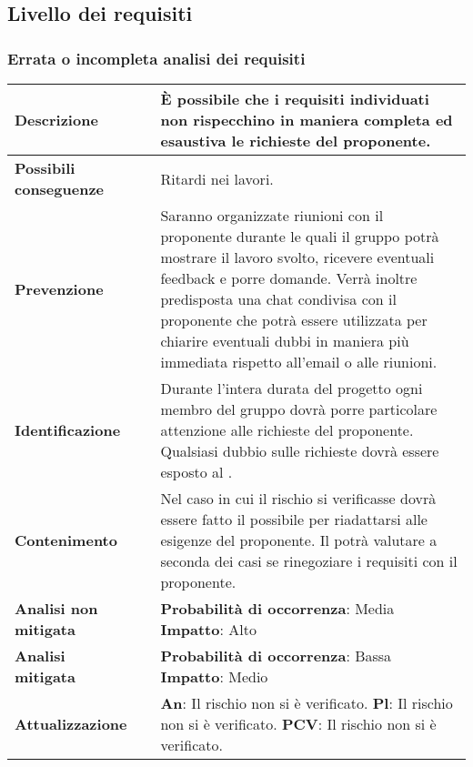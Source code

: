 	\newpage
	\subsection {Livello dei requisiti}
	\subsubsection {Errata o incompleta analisi dei requisiti}
	\label{subsec:erratiRequisiti}
	
	\small
	\begin{table}[H]
		\begin{center}			
			\begin{tabular}{p{2.5cm}p{0.5cm}p{11cm}}
				\arrayrulecolor{lightgray}
				
				\toprule				
				\textbf{Descrizione}
				& &
				È possibile che i requisiti individuati non rispecchino in maniera completa ed esaustiva le richieste del proponente.
				\\
				\midrule
				\textbf{Possibili \newline conseguenze}
				& &
				Ritardi nei lavori.
				\\
				\midrule
				\textbf{Prevenzione}
				& &
				Saranno organizzate riunioni con il proponente durante le quali il gruppo potrà mostrare il lavoro svolto, ricevere eventuali feedback e porre domande. Verrà inoltre predisposta una chat condivisa con il proponente che potrà essere utilizzata per chiarire eventuali dubbi in maniera più immediata rispetto all'email o alle riunioni.
				\\
				\midrule
				\textbf{Identificazione}
				& &
				Durante l'intera durata del progetto ogni membro del gruppo dovrà porre particolare attenzione alle richieste del proponente. Qualsiasi dubbio sulle richieste dovrà essere esposto al \responsabilediprogetto.
				\\
				\midrule
				\textbf{Contenimento}
				& &
				Nel caso in cui il rischio si verificasse dovrà essere fatto il possibile per riadattarsi alle esigenze del proponente. Il \responsabilediprogetto{} potrà valutare a seconda dei casi se rinegoziare i requisiti con il proponente.
				\\
				\midrule
				\textbf{Analisi \newline non mitigata}
				& &
				\textbf{Probabilità di occorrenza}: Media
				\newline
				\textbf{Impatto}: Alto
				\\
				\midrule
				\textbf{Analisi \newline mitigata}
				& &
				\textbf{Probabilità di occorrenza}: Bassa
				\newline
				\textbf{Impatto}: Medio
				\\
				\midrule
				\textbf{Attualizzazione}
				& &
				\textbf{An}: Il rischio non si è verificato.
				\newline
				\textbf{Pl}: Il rischio non si è verificato.
				\newline
				\textbf{PCV}: Il rischio non si è verificato.
				\\
				
				\bottomrule	
			\end{tabular}
		\end{center}
	\end{table}			

